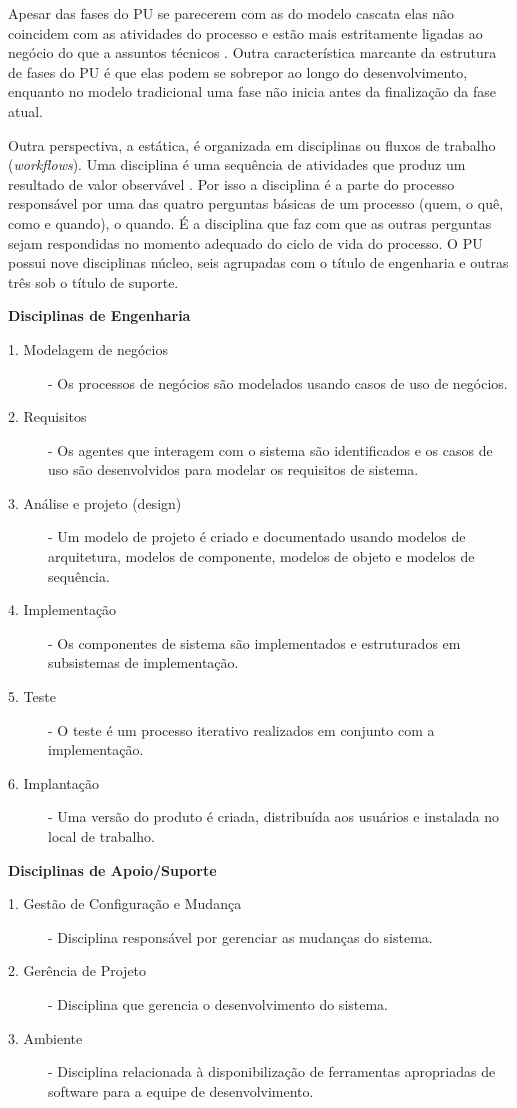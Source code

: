 \documentclass[
	article,			%
	11pt,				%
	oneside,			%
	a4paper,			%
	english,			%
	brazil,				%
	sumario=tradicional
	]{abntex2}
\begin{document}
Apesar das fases do PU se parecerem com as do modelo cascata elas não coincidem
com as atividades do processo e estão mais estritamente ligadas ao negócio do
que a assuntos técnicos \cite{sommerville2007}. Outra característica marcante
da estrutura de fases do PU é que elas podem se sobrepor ao longo do
desenvolvimento, enquanto no modelo tradicional uma fase não inicia antes da
finalização da fase atual.

Outra perspectiva, a estática, é organizada em disciplinas ou fluxos de trabalho
(\textit{workflows}). Uma disciplina é uma sequência de atividades que produz um
resultado de valor observável \cite{Corporation1998}. Por isso a disciplina é a
parte do processo responsável por uma das quatro perguntas básicas de um
processo (quem, o quê, como e quando), o quando. É a disciplina que faz com que
as outras perguntas sejam respondidas no momento adequado do ciclo de vida do
processo. O PU possui nove disciplinas núcleo, seis agrupadas com o título de
engenharia e outras três sob o título de suporte.

\textbf{Disciplinas de Engenharia}

\begin{description}
   \item[1. Modelagem de negócios] - Os processos de negócios são modelados
   usando casos de uso de negócios.
   \item[2. Requisitos] - Os agentes que interagem com o sistema são
   identificados e os casos de uso são desenvolvidos para modelar os requisitos de sistema.
   \item[3. Análise e projeto (design)] - Um modelo de projeto é criado e
   documentado usando modelos de arquitetura, modelos de componente, modelos de
   objeto e modelos de sequência.
   \item[4. Implementação] - Os componentes de sistema são implementados e
   estruturados em subsistemas de implementação.
   \item[5. Teste] - O teste é um processo iterativo realizados em conjunto com
   a implementação.
   \item[6. Implantação] - Uma versão do produto é criada, distribuída aos
   usuários e instalada no local de trabalho.
\end{description}

\textbf{Disciplinas de Apoio/Suporte}

\begin{description}
   \item[1. Gestão de Configuração e Mudança] - Disciplina responsável por
   gerenciar as mudanças do sistema.
   \item[2. Gerência de Projeto] - Disciplina que gerencia o desenvolvimento do
   sistema.
   \item[3. Ambiente] - Disciplina relacionada à disponibilização de ferramentas
   apropriadas de software para a equipe de desenvolvimento.
\end{description}
\end{document}
